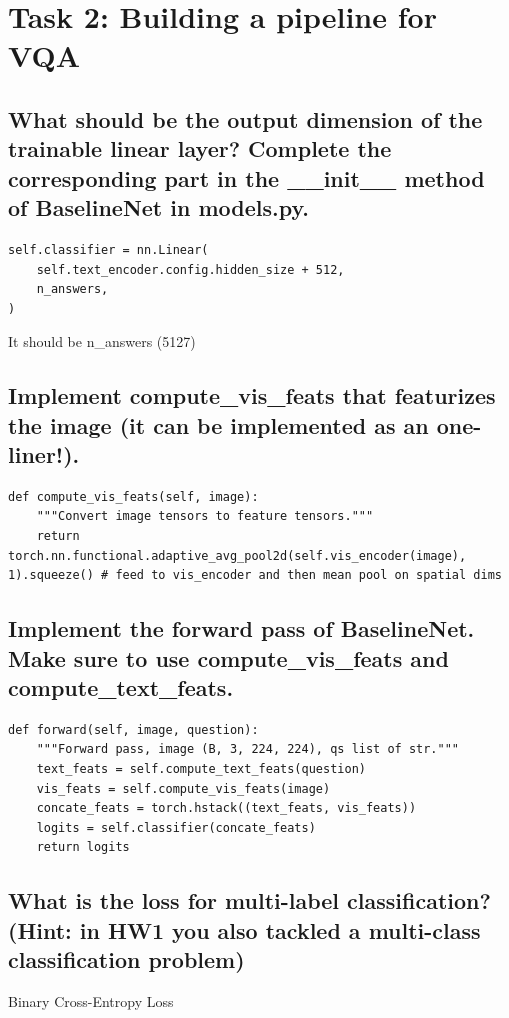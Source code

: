 \documentclass{article}
\begin{document}
\setcounter{section}{2}
\section*{Task 2: Building a pipeline for VQA}

\setcounter{subsection}{0}
\subsection{What should be the output dimension of the trainable linear layer? Complete the corresponding part in the \_\_init\_\_ method of BaselineNet in models.py.}
\begin{lstlisting}
self.classifier = nn.Linear(
    self.text_encoder.config.hidden_size + 512,
    n_answers,
)
\end{lstlisting}
It should be n\_answers (5127)

\subsection{Implement compute\_vis\_feats that featurizes the image (it can be implemented as an one-liner!).}
\begin{lstlisting}
def compute_vis_feats(self, image):
    """Convert image tensors to feature tensors."""
    return torch.nn.functional.adaptive_avg_pool2d(self.vis_encoder(image), 1).squeeze() # feed to vis_encoder and then mean pool on spatial dims
\end{lstlisting}

\subsection{Implement the forward pass of BaselineNet. Make sure to use compute\_vis\_feats and compute\_text\_feats.}
\begin{lstlisting}
def forward(self, image, question):
    """Forward pass, image (B, 3, 224, 224), qs list of str."""
    text_feats = self.compute_text_feats(question)
    vis_feats = self.compute_vis_feats(image)
    concate_feats = torch.hstack((text_feats, vis_feats))
    logits = self.classifier(concate_feats)
    return logits
\end{lstlisting}

\subsection{What is the loss for multi-label classification? (Hint: in HW1 you also tackled a multi-class classification problem)}
Binary Cross-Entropy Loss
\end{document}
